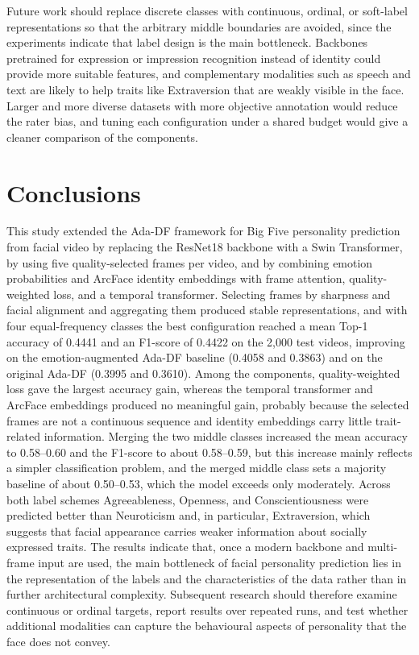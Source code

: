 \documentclass[10pt,a4paper,twocolumn]{article}
\begin{document}
Future work should replace discrete classes with continuous, ordinal, or soft-label representations so that the arbitrary middle boundaries are avoided, since the experiments indicate that label design is the main bottleneck. Backbones pretrained for expression or impression recognition instead of identity could provide more suitable features, and complementary modalities such as speech and text are likely to help traits like Extraversion that are weakly visible in the face. Larger and more diverse datasets with more objective annotation would reduce the rater bias, and tuning each configuration under a shared budget would give a cleaner comparison of the components.

\section{Conclusions}
This study extended the Ada-DF framework for Big Five personality prediction from facial video by replacing the ResNet18 backbone with a Swin Transformer, by using five quality-selected frames per video, and by combining emotion probabilities and ArcFace identity embeddings with frame attention, quality-weighted loss, and a temporal transformer. Selecting frames by sharpness and facial alignment and aggregating them produced stable representations, and with four equal-frequency classes the best configuration reached a mean Top-1 accuracy of 0.4441 and an F1-score of 0.4422 on the 2,000 test videos, improving on the emotion-augmented Ada-DF baseline (0.4058 and 0.3863) and on the original Ada-DF (0.3995 and 0.3610). Among the components, quality-weighted loss gave the largest accuracy gain, whereas the temporal transformer and ArcFace embeddings produced no meaningful gain, probably because the selected frames are not a continuous sequence and identity embeddings carry little trait-related information. Merging the two middle classes increased the mean accuracy to 0.58--0.60 and the F1-score to about 0.58--0.59, but this increase mainly reflects a simpler classification problem, and the merged middle class sets a majority baseline of about 0.50--0.53, which the model exceeds only moderately. Across both label schemes Agreeableness, Openness, and Conscientiousness were predicted better than Neuroticism and, in particular, Extraversion, which suggests that facial appearance carries weaker information about socially expressed traits. The results indicate that, once a modern backbone and multi-frame input are used, the main bottleneck of facial personality prediction lies in the representation of the labels and the characteristics of the data rather than in further architectural complexity. Subsequent research should therefore examine continuous or ordinal targets, report results over repeated runs, and test whether additional modalities can capture the behavioural aspects of personality that the face does not convey.
\end{document}
